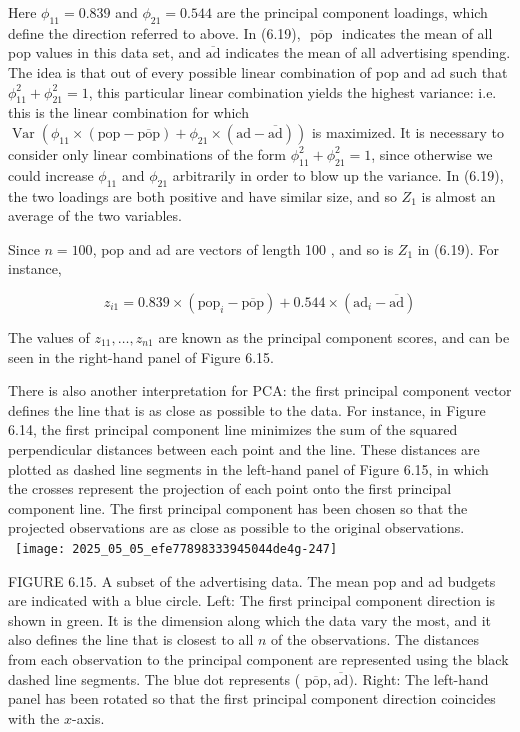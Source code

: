 \documentclass[10pt]{article}
\begin{document}
Here $\phi_{11}=0.839$ and $\phi_{21}=0.544$ are the principal component loadings, which define the direction referred to above. In (6.19), $\overline{\text { pop }}$ indicates the mean of all pop values in this data set, and $\overline{\mathrm{ad}}$ indicates the mean of all advertising spending. The idea is that out of every possible linear combination of pop and ad such that $\phi_{11}^{2}+\phi_{21}^{2}=1$, this particular linear combination yields the highest variance: i.e. this is the linear combination for which $\operatorname{Var}\left(\phi_{11} \times(\mathrm{pop}-\overline{\mathrm{pop}})+\phi_{21} \times(\mathrm{ad}-\overline{\mathrm{ad}})\right)$ is maximized. It is necessary to consider only linear combinations of the form $\phi_{11}^{2}+\phi_{21}^{2}=1$, since otherwise we could increase $\phi_{11}$ and $\phi_{21}$ arbitrarily in order to blow up the variance. In (6.19), the two loadings are both positive and have similar size, and so $Z_{1}$ is almost an average of the two variables.

Since $n=100$, pop and ad are vectors of length 100 , and so is $Z_{1}$ in (6.19). For instance,


\begin{equation*}
z_{i 1}=0.839 \times\left(\mathrm{pop}_{i}-\overline{\mathrm{pop}}\right)+0.544 \times\left(\mathrm{ad}_{i}-\overline{\mathrm{ad}}\right) \tag{6.20}
\end{equation*}


The values of $z_{11}, \ldots, z_{n 1}$ are known as the principal component scores, and can be seen in the right-hand panel of Figure 6.15.

There is also another interpretation for PCA: the first principal component vector defines the line that is as close as possible to the data. For instance, in Figure 6.14, the first principal component line minimizes the sum of the squared perpendicular distances between each point and the line. These distances are plotted as dashed line segments in the left-hand panel of Figure 6.15, in which the crosses represent the projection of each point onto the first principal component line. The first principal component has been chosen so that the projected observations are as close as possible to the original observations.\
\
\texttt{[image: 2025\_05\_05\_efe77898333945044de4g-247]}

FIGURE 6.15. A subset of the advertising data. The mean pop and ad budgets are indicated with a blue circle. Left: The first principal component direction is shown in green. It is the dimension along which the data vary the most, and it also defines the line that is closest to all $n$ of the observations. The distances from each observation to the principal component are represented using the black dashed line segments. The blue dot represents ( $\overline{\mathrm{pop}}, \overline{\mathrm{ad}})$. Right: The left-hand panel has been rotated so that the first principal component direction coincides with the $x$-axis.
\end{document}
